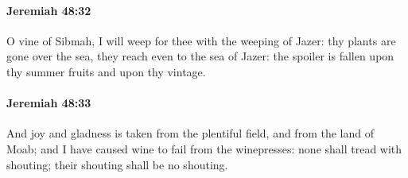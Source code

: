 		\paragraph{Jeremiah 48:32} %
			\label{JEREMIAH-48-32}

			O vine of Sibmah, I will weep for thee with the weeping of Jazer: thy plants are gone over the sea, they reach even to the sea of Jazer: the spoiler is fallen upon thy summer fruits and upon thy vintage.


		\paragraph{Jeremiah 48:33} %
			\label{JEREMIAH-48-33}

			And joy and gladness is taken from the plentiful field, and from the land of Moab; and I have caused wine to fail from the winepresses: none shall tread with shouting; their shouting shall be no shouting.

